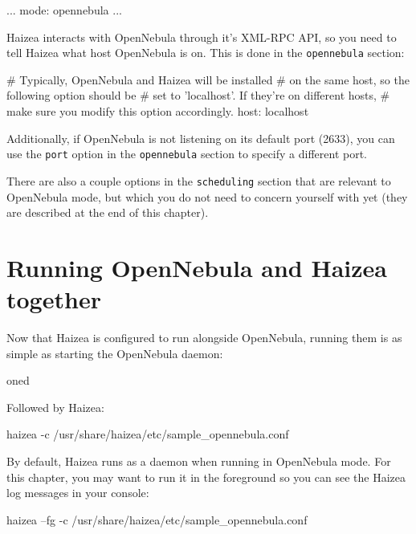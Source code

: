 \begin{wideshellverbatim}
[general]
...
mode: opennebula
...
\end{wideshellverbatim}

Haizea interacts with OpenNebula through it's XML-RPC API, so you need to tell Haizea what host OpenNebula is on. This is done in the \texttt{opennebula} section:

\begin{wideshellverbatim}
[opennebula]
# Typically, OpenNebula and Haizea will be installed
# on the same host, so the following option should be
# set to 'localhost'. If they're on different hosts,
# make sure you modify this option accordingly.
host: localhost
\end{wideshellverbatim}

Additionally, if OpenNebula is not listening on its default port (2633), you can use the \texttt{port} option in the \texttt{opennebula} section to specify a different port.

There are also a couple options in the \texttt{scheduling} section that are relevant to OpenNebula mode, but which you do not need to concern yourself with yet (they are described at the end of this chapter).

\section{Running OpenNebula and Haizea together}

Now that Haizea is configured to run alongside OpenNebula, running them is as simple as starting the OpenNebula daemon:

\begin{wideshellverbatim}
oned
\end{wideshellverbatim}


Followed by Haizea:

\begin{wideshellverbatim}
haizea -c /usr/share/haizea/etc/sample_opennebula.conf
\end{wideshellverbatim}

By default, Haizea runs as a daemon when running in OpenNebula mode. For this chapter, you may want to run it in the foreground so you can see the Haizea log messages in your console:

\begin{wideshellverbatim}
haizea --fg -c /usr/share/haizea/etc/sample_opennebula.conf
\end{wideshellverbatim}

